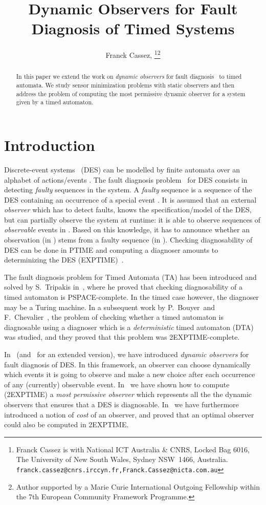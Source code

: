\documentclass[letterpaper,10pt,conference]{ieeeconf}  \IEEEoverridecommandlockouts                              \overrideIEEEmargins
\title{\LARGE \bf Dynamic Observers for Fault Diagnosis of Timed
  Systems}
\author{Franck Cassez, \IEEEmembership{Member, IEEE}\thanks{Franck Cassez is with National ICT Australia \& CNRS, Locked
    Bag 6016, The University of New South Wales, Sydney NSW~1466,
    Australia. \texttt{\scriptsize
      franck.cassez@cnrs.irccyn.fr,Franck.Cassez@nicta.com.au}}\thanks{Author supported by a Marie Curie International Outgoing
    Fellowship within the 7th European Community Framework Programme.}
}
\begin{document}
\maketitle
  
\thispagestyle{empty}

\begin{abstract} 
  In this paper we extend the work on \emph{dynamic ob\-servers} for
  fault diagnosis~\cite{cassez-acsd-07,cassez-tase-07,cassez-fi-08} to
  timed automata. We study sensor minimization problems with static
  observers and then address the problem of computing the most
  permissive dynamic observer for a system given by a timed automaton.
\end{abstract}

\section{Introduction}


Discrete-event systems~\cite{RW87} (DES) can be modelled by finite
automata over an alphabet of actions/events .  The fault
diagnosis problem~\cite{Raja95} for DES consists in detecting
\emph{faulty} sequences in the system.
A \emph{faulty} sequence is a sequence of the DES containing an
occurrence of a special event .  It is assumed that an external
\emph{observer} which has to detect faults, knows the
specification/model of the DES, but can partially observe the system
at runtime: it is able to observe sequences of \emph{observable}
events in .  Based on this knowledge, it
has to announce whether an observation (in ) stems from a
faulty sequence (in ). Checking diagnosability of DES can be done in PTIME and computing a
diagnoser amounts to determinizing the DES
(EXPTIME)~\cite{Raja95,Jiang-01,yoo-lafortune-tac-02}.
\smallskip

The fault diagnosis problem for Timed Automata (TA) has been
introduced and solved by S.~Tripakis in~\cite{tripakis-02}, where he
proved that checking {diagnosability} of a timed automaton is
PSPACE-complete.  In the timed case however, the diagnoser may be a
Turing machine.  In a subsequent work by P.~Bouyer~and
F.~Chevalier~\cite{Bouyerfossacs05}, the problem of checking whether a
timed automaton is diagnosable using a diagnoser which is a
\emph{deterministic} timed automaton (DTA) was studied, and they
proved that this problem was 2EXPTIME-complete.
\smallskip

In~\cite{cassez-acsd-07,cassez-tase-07} (and~\cite{cassez-fi-08} for
an extended version), we have introduced \emph{dynamic observers} for
fault diagnosis of DES.  In this framework, an observer can choose
dynamically which events it is going to observe and make a new choice
after each occurrence of any (currently) observable event.
In~\cite{cassez-acsd-07,cassez-fi-08} we have shown how to compute
(2EXPTIME) a \emph{most permissive observer} which represents all the
the dynamic observers that ensures that a DES is diagnosable.
In~\cite{cassez-tase-07} we have furthermore introduced a notion of
\emph{cost} of an observer, and proved that an optimal observer could
also be computed in 2EXPTIME.
\end{document}
